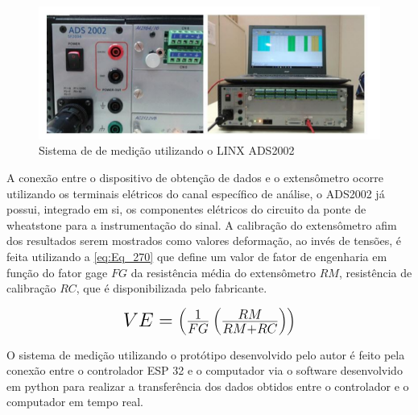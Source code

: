 \begin{figure}[htb]
	\caption{\label{fig:2060} Sistema de de medição utilizando o LINX ADS2002}
	\begin{center}
		\includegraphics[width=\textwidth]{pictures/2060.png}
	\end{center}
\end{figure}

A conexão entre o dispositivo de obtenção de dados e o extensômetro ocorre utilizando os terminais elétricos do canal específico de análise, o ADS2002 já possui,
integrado em si, os componentes elétricos do circuito da ponte de wheatstone para a instrumentação do sinal.
A calibração do extensômetro afim dos resultados serem mostrados como valores deformação, ao invés de tensões, é feita utilizando a \autoref{eq:Eq_270} que define um valor de
fator de engenharia em função do fator gage $FG$ da resistência média do extensômetro $RM$, resistência de calibração $RC$, que é disponibilizada pelo fabricante.

\begin{equation}\label{eq:Eq_270}%
\mbox{\fontsize{17.28}{21.6}\selectfont\( %
VE = \left ( \frac{1}{FG}\left ( \frac{RM}{RM + RC} \right ) \right )
\)} %
\end{equation}

\newline

O sistema de medição utilizando o protótipo desenvolvido pelo autor é feito pela conexão entre o controlador ESP 32 e o computador via o software desenvolvido em python
para realizar a transferência dos dados obtidos entre o controlador e o computador em tempo real.

